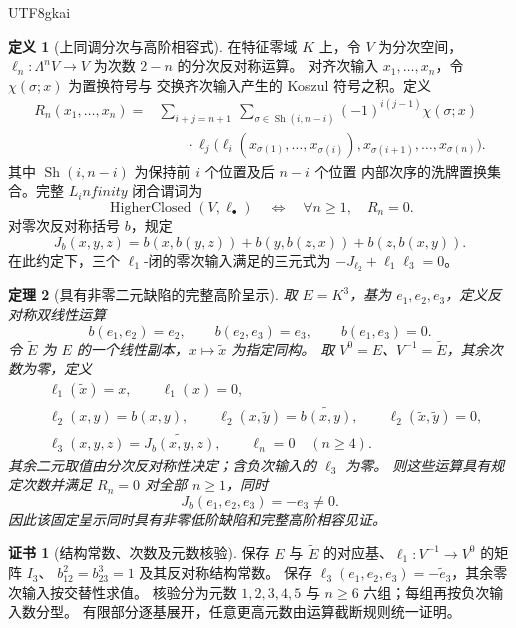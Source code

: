 \documentclass[12pt,a4paper,openany,notitlepage]{report}
\theoremstyle{plain}
\newtheorem{theorem}{定理}[chapter]
\theoremstyle{definition}
\newtheorem{definition}[theorem]{定义}
\newtheorem*{certificate}{证书}
\theoremstyle{remark}
\def\mathcal#1{#1}\def\mathsf#1{#1}\def\mathbb#1{#1}%
\def\infty{infinity}\def\Gamma{Gamma}\def\Phi{Phi}%
\begin{document}
\begin{CJK*}{UTF8}{gkai}
\begin{definition}[上同调分次与高阶相容式]
\label{hgov:linfty:convention}
在特征零域 $\mathbb K$ 上，令 $V$ 为分次空间，
$\ell_n:\Lambda^n V\to V$ 为次数 $2-n$ 的分次反对称运算。
对齐次输入 $x_1,\ldots,x_n$，令 $\chi(\sigma;x)$ 为置换符号与
交换齐次输入产生的 Koszul 符号之积。定义
\[
\begin{aligned}
\mathcal R_n(x_1,\ldots,x_n)
={}&\sum_{i+j=n+1}\ \sum_{\sigma\in\operatorname{Sh}(i,n-i)}
(-1)^{i(j-1)}\chi(\sigma;x)\\
&\qquad\cdot
\ell_j\bigl(\ell_i(x_{\sigma(1)},\ldots,x_{\sigma(i)}),
x_{\sigma(i+1)},\ldots,x_{\sigma(n)}\bigr).
\end{aligned}
\]
其中 $\operatorname{Sh}(i,n-i)$ 为保持前 $i$ 个位置及后 $n-i$ 个位置
内部次序的洗牌置换集合。完整 $L_\infty$ 闭合谓词为
\[
\operatorname{HigherClosed}(V,\ell_\bullet)
\quad\Longleftrightarrow\quad
\forall n\ge1,\quad\mathcal R_n=0.
\]
对零次反对称括号 $b$，规定
\[
J_b(x,y,z)=b(x,b(y,z))+b(y,b(z,x))+b(z,b(x,y)).
\]
在此约定下，三个 $\ell_1$-闭的零次输入满足的三元式为
$-J_{\ell_2}+\ell_1\ell_3=0$。
\end{definition}

\begin{theorem}[具有非零二元缺陷的完整高阶呈示]
\label{hgov:linfty:model}
取 $E=\mathbb K^3$，基为 $e_1,e_2,e_3$，定义反对称双线性运算
\[
b(e_1,e_2)=e_2,\qquad b(e_2,e_3)=e_3,\qquad b(e_1,e_3)=0.
\]
令 $\widetilde E$ 为 $E$ 的一个线性副本，$x\mapsto\widetilde x$ 为指定同构。
取 $V^0=E$、$V^{-1}=\widetilde E$，其余次数为零，定义
\[
\begin{aligned}
&\ell_1(\widetilde x)=x,\qquad \ell_1(x)=0,\\
&\ell_2(x,y)=b(x,y),\qquad
\ell_2(x,\widetilde y)=\widetilde{b(x,y)},\qquad
\ell_2(\widetilde x,\widetilde y)=0,\\
&\ell_3(x,y,z)=\widetilde{J_b(x,y,z)},\qquad
\ell_n=0\quad(n\ge4).
\end{aligned}
\]
其余二元取值由分次反对称性决定；含负次输入的 $\ell_3$ 为零。
则这些运算具有规定次数并满足 $\mathcal R_n=0$ 对全部 $n\ge1$，同时
\[
J_b(e_1,e_2,e_3)=-e_3\ne0.
\]
因此该固定呈示同时具有非零低阶缺陷和完整高阶相容见证。
\end{theorem}

\begin{certificate}[结构常数、次数及元数核验]
\label{hgov:linfty:model-certificate}
保存 $E$ 与 $\widetilde E$ 的对应基、$\ell_1:V^{-1}\to V^0$ 的矩阵 $I_3$、
$b_{12}^{2}=b_{23}^{3}=1$ 及其反对称结构常数。
保存 $\ell_3(e_1,e_2,e_3)=-\widetilde e_3$，其余零次输入按交替性求值。
核验分为元数 $1,2,3,4,5$ 与 $n\ge6$ 六组；每组再按负次输入数分型。
有限部分逐基展开，任意更高元数由运算截断规则统一证明。
\end{certificate}


\end{CJK*}
\end{document}
